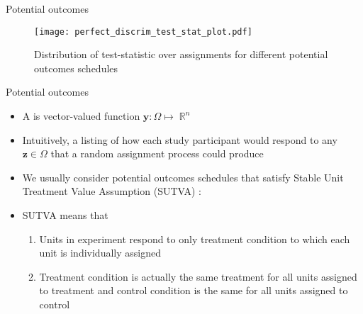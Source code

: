 \documentclass[table, xcolor = {dvipsnames}, 9pt]{beamer}
\theoremstyle{plain}
\newcommand{\mh}[1]{{\color{magenta}{#1}}}
\DeclareMathOperator{\R}{\mathbb{R}}
\begin{document}
\begin{frame}{Potential outcomes}
\vfill
\begin{figure}[H]
\texttt{[image: perfect\_discrim\_test\_stat\_plot.pdf]}
\caption{Distribution of test-statistic over assignments for different potential outcomes schedules}
\end{figure} \vfill
\end{frame}
\begin{frame}{Potential outcomes}
\vfill
\begin{itemize} \vfill
\item A \mh{potential outcomes schedule} is vector-valued function $\bm{y}: \Omega \mapsto \R^n$ \vfill
\item Intuitively, a listing of how each study participant would respond to any $\bm{z} \in \Omega$ that a random assignment process could produce \vfill
\item We usually consider potential outcomes schedules that satisfy Stable Unit Treatment Value Assumption (SUTVA) \citep{cox1958a,rubin1980b,rubin1986}: \vfill
\item SUTVA means that \vfill
\begin{enumerate} \vfill
\item Units in experiment respond to only treatment condition to which each unit is individually assigned \vfill
\item Treatment condition is actually the same treatment for all units assigned to treatment and control condition is the same for all units assigned to control \vfill
\end{enumerate} \vfill
\end{itemize}  
\vfill
\end{frame}
\end{document}
